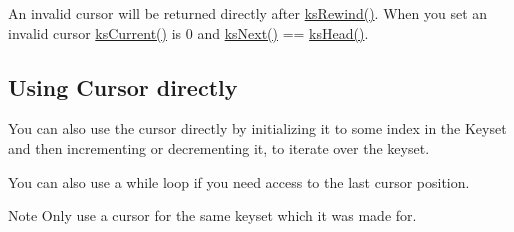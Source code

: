An invalid cursor will be returned directly after \mbox{\hyperlink{group__keyset_gabe793ff51f1728e3429c84a8a9086b70}{ks\+Rewind()}}. When you set an invalid cursor \mbox{\hyperlink{group__keyset_ga4287b9416912c5f2ab9c195cb74fb094}{ks\+Current()}} is 0 and \mbox{\hyperlink{group__keyset_ga317321c9065b5a4b3e33fe1c399bcec9}{ks\+Next()}} == \mbox{\hyperlink{group__keyset_gae7dbf3aef70e67b5328475eb3d1f92f5}{ks\+Head()}}.\hypertarget{group__keyset_cursor_directly}{}\subsection{Using Cursor directly}\label{group__keyset_cursor_directly}
You can also use the cursor directly by initializing it to some index in the Keyset and then incrementing or decrementing it, to iterate over the keyset.


\begin{DoxyCodeInclude}{0}
\DoxyCodeLine{        \{}
\DoxyCodeLine{        \}}
\end{DoxyCodeInclude}


You can also use a while loop if you need access to the last cursor position.


\begin{DoxyCodeInclude}{0}
\DoxyCodeLine{}
\DoxyCodeLine{        \{}
\DoxyCodeLine{        \}}
\end{DoxyCodeInclude}


\begin{DoxyNote}{Note}
Only use a cursor for the same keyset which it was made for.
\end{DoxyNote}

